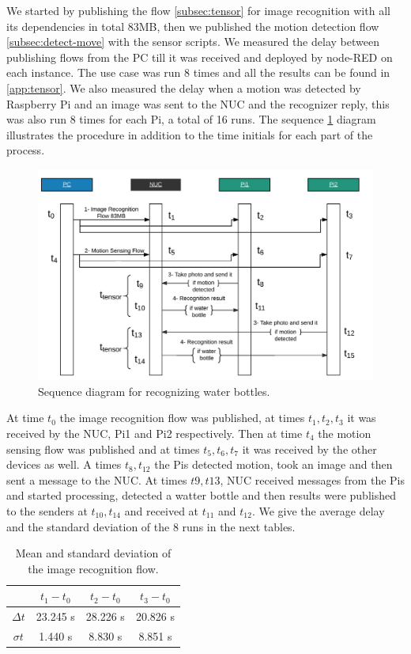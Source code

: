 \noindent We started by publishing the flow \ref{subsec:tensor} for  image recognition with all its dependencies in total 83MB, then we published the motion detection flow \ref{subsec:detect-move} with the sensor scripts. We measured the delay between publishing flows from the PC till it was received and deployed by node-RED on each instance. The use case was run 8 times and all the results can be found in \ref{app:tensor}. We also measured the delay when a motion was detected by Raspberry Pi and an image was sent to the NUC and the recognizer reply, this was also run 8 times for each Pi, a total of 16 runs. The sequence \ref{fig:sd-tensor} diagram illustrates the procedure in addition to the time initials for each part of the process.  
\begin{figure}[H]
	\centering
	\includegraphics[scale=0.45]{images/sequence-diagram.png}
	\caption{Sequence diagram for recognizing water bottles.}
	\label{fig:sd-tensor}
\end{figure} 

\noindent At time $t_0$ the image recognition flow was published, at times $t_1, t_2, t_3$ it was received by the NUC, Pi1 and Pi2 respectively. Then at time $t_4$ the motion sensing flow was published and at times $t_5,t_6,t_7$ it was received by the other devices as well. A times $t_8,t_{12}$  the Pis detected motion, took an image and then sent a message to the NUC. At times $t9,t{13}$,  NUC received messages from the Pis and started processing, detected a watter bottle and then results were published to the senders at $t_{10},t_{14}$ and received at $t_{11}$ and $t_{12}$. We give the average delay and the standard deviation of the 8 runs in the next tables.
\begin{table}[!ht]
\centering
\begin{tabular}{*{4}{c}}\toprule
&$t_1 - t_0$  & $t_2 - t_0$  & $t_3-t_0$ \\ \midrule
$\Delta t$&	23.245 s&28.226 s&20.826 s\\ 
$\sigma	t$ &1.440 s&8.830 s&8.851 s\\
\end{tabular}
\caption{Mean and standard deviation of the image recognition flow.}
\label{table:tensor}
\end{table}


